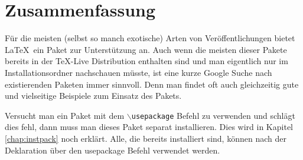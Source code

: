 \section{Zusammenfassung}

Für die meisten (selbst so manch exotische) Arten von Veröffentlichungen bietet \LaTeX\ ein Paket zur Unterstützung an. Auch wenn die meisten dieser Pakete bereits in der \TeX-Live Distribution enthalten sind und man eigentlich nur im Installationsordner nachschauen müsste, ist eine kurze Google Suche nach existierenden Paketen immer sinnvoll. Denn man findet oft auch gleichzeitig gute und vielseitige Beispiele zum Einsatz des Pakets. 

Versucht man ein Paket mit dem \texttt{$\backslash$usepackage} Befehl zu verwenden und schlägt dies fehl, dann muss man dieses Paket separat installieren. Dies wird in Kapitel \ref{chap:instpack} noch erklärt. Alle, die bereits installiert sind, können nach der Deklaration über den usepackage Befehl verwendet werden.



